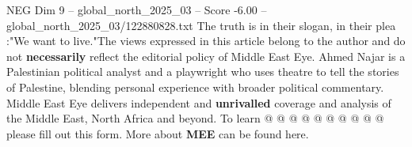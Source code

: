 \begin{textsample}{NEG Dim 9 – global\_north\_2025\_03 – Score -6.00 – global\_north\_2025\_03/122880828.txt}
The truth is in their slogan, in their plea :"We want to live."The views expressed in this article belong to the author and do not \textbf{necessarily} reflect the editorial policy of Middle East Eye.
Ahmed Najar is a Palestinian political analyst and a playwright who uses theatre to tell the stories of Palestine, blending personal experience with broader political commentary.
Middle East Eye delivers independent and \textbf{unrivalled} coverage and analysis of the Middle East, North Africa and beyond.
To learn @ @ @ @ @ @ @ @ @ @ please fill out this form.
More about \textbf{MEE} can be found here.

\end{textsample}
